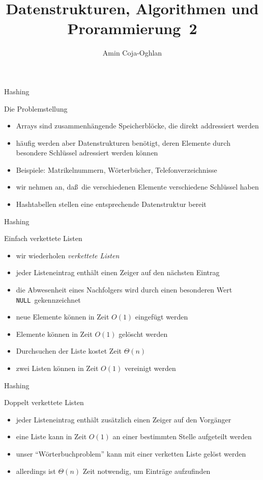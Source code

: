 \documentclass[aspectratio=1610, 11pt]{beamer}
\title{Datenstrukturen, Algorithmen und Prorammierung~2}
\author[A.~Coja-Oghlan]{Amin Coja-Oghlan}
\institute[DAP2]{Lehrstuhl Informatik 2\\Fakult\"at f\"ur Informatik}
\newcommand\NULL{{\tt NULL}}
\begin{document}
\maketitle

\begin{frame}{Hashing}
	\begin{exampleblock}{Die Problemstellung}
		\begin{itemize}
			\item Arrays sind zusammenh\"angende Speicherbl\"ocke, die direkt addressiert werden
			\item h\"aufig werden aber Datenstrukturen ben\"otigt, deren Elemente durch besondere Schl\"ussel adressiert werden k\"onnen
			\item \alert{Beispiele:} Matrikelnummern, W\"orterb\"ucher, Telefonverzeichnisse 
			\item wir nehmen an, da\ss\ die verschiedenen Elemente verschiedene Schl\"ussel haben
			\item Hashtabellen stellen eine entsprechende Datenstruktur bereit 
		\end{itemize}
	\end{exampleblock}
\end{frame}

\begin{frame}{Hashing}
	\begin{exampleblock}{Einfach verkettete Listen}
		\begin{itemize}
			\item wir wiederholen {\em verkettete Listen}
			\item jeder Listeneintrag enth\"alt einen \alert{Zeiger} auf den n\"achsten Eintrag 
			\item die Abwesenheit eines Nachfolgers wird durch einen besonderen Wert \NULL\ gekennzeichnet
			\item neue Elemente k\"onnen in Zeit $O(1)$ eingef\"ugt werden
			\item Elemente k\"onnen in Zeit $O(1)$ gel\"oscht werden
			\item Durchsuchen der Liste kostet Zeit $\Theta(n)$
			\item zwei Listen k\"onnen in Zeit $O(1)$ vereinigt werden
		\end{itemize}
	\end{exampleblock}
\end{frame}

\begin{frame}{Hashing}
	\begin{exampleblock}{Doppelt verkettete Listen}
		\begin{itemize}
			\item jeder Listeneintrag enth\"alt zus\"atzlich einen Zeiger auf den Vorg\"anger
			\item eine Liste kann in Zeit $O(1)$ an einer bestimmten Stelle aufgeteilt werden
			\item unser ``W\"orterbuchproblem'' kann mit einer verketten Liste gel\"ost werden
			\item allerdings ist $\Theta(n)$ Zeit notwendig, um Eintr\"age aufzufinden
		\end{itemize}
	\end{exampleblock}
\end{frame}
\end{document}
